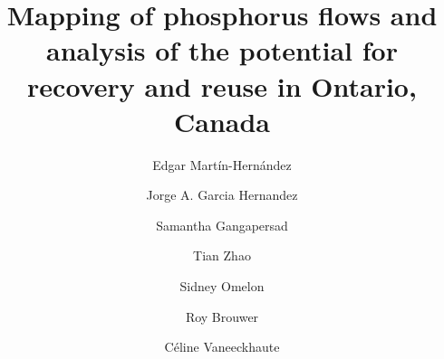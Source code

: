 \documentclass[authoryear]{elsarticle}
\begin{document}
\begin{frontmatter}
	\title{
	Mapping of phosphorus flows and analysis of the potential for recovery and reuse in Ontario, Canada
	}
	
	\author[ULaval]{Edgar Martín-Hernández}
	\author[Waterloo]{Jorge A. Garcia Hernandez}
	\author[McGill]{Samantha Gangapersad}
	\author[McGill]{Tian Zhao}
	\author[McGill]{Sidney Omelon}
	\author[Waterloo,TheWaterInstitute]{Roy Brouwer}
	\author[ULaval,CentrEau]{Céline Vaneeckhaute}
		
	\address[ULaval]{BioEngine - Research Team on Green Process Engineering and Biorefineries, Chemical Engineering Department, Université Laval, 1065 Ave. de la Médecine, Québec, QC, G1V 0A6, Canada}
	\address[CentrEau]{CentrEau, Centre de recherche sur l'eau, Université Laval, 1065 Avenue de la Médecine, Québec, QC, G1V 0A6, Canada}
	\address[McGill]{Department of Mining and Materials	Engineering, McGill University, Montréal, Canada}
	\address[Waterloo]{Department of Economics, University of Waterloo, 200 University Avenue West, Waterloo, ON, N2L 3G1, Canada}
	\address[TheWaterInstitute]{The Water Institute, University of Waterloo, 200 University Avenue West, Waterloo, ON, N2L 3G1, Canada}
	

\end{frontmatter}
\end{document}
